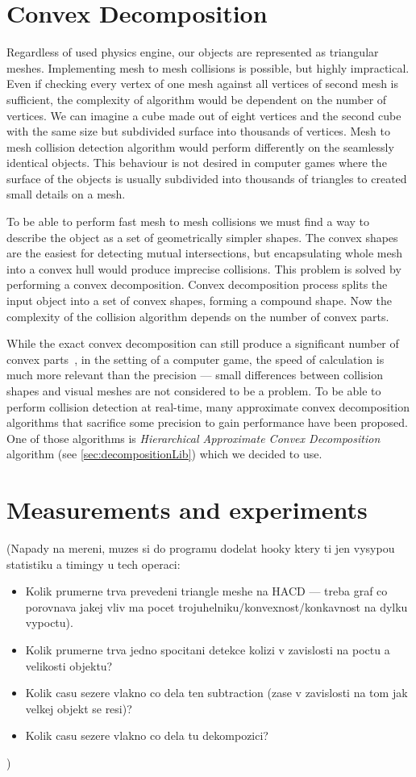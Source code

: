 \section{Convex Decomposition}
\label{sec:decomposition}
Regardless of used physics engine, our objects are represented as triangular meshes. Implementing mesh to mesh collisions is possible, but highly impractical. Even if checking every vertex of one mesh against all vertices of second mesh is sufficient, the complexity of algorithm would be dependent on the number of vertices. We can imagine a cube made out of eight vertices and the second cube with the same size but subdivided surface into thousands of vertices. Mesh to mesh collision detection algorithm would perform differently on the seamlessly identical objects. This behaviour is not desired in computer games where the surface of the objects is usually subdivided into thousands of triangles to created small details on a mesh.

To be able to perform fast mesh to mesh collisions we must find a way to describe the object as a set of geometrically simpler shapes. The convex shapes are the easiest for detecting mutual intersections, but encapsulating whole mesh into a convex hull would produce imprecise collisions. This problem is solved by performing a convex decomposition. Convex decomposition process splits the input object into a set of convex shapes, forming a compound shape. Now the complexity of the collision algorithm depends on the number of convex parts. 

While the exact convex decomposition can still produce a significant number of convex parts~\cite{convexDecomp}, in the setting of a computer game, the speed of calculation is much more relevant than the precision --- small differences between collision shapes and visual meshes are not considered to be a problem. To be able to perform collision detection at real-time, many approximate convex decomposition algorithms that sacrifice some precision to gain performance have been proposed. One of those algorithms is \emph{Hierarchical Approximate Convex Decomposition} algorithm (see \cref{sec:decompositionLib}) which we decided to use.

\section{Measurements and experiments}
\label{sec:testing}

(Napady na mereni, muzes si do programu dodelat hooky ktery ti jen vysypou statistiku a timingy u tech operaci:
\begin{itemize}
\item Kolik prumerne trva prevedeni triangle meshe na HACD --- treba graf co porovnava jakej vliv ma pocet trojuhelniku/konvexnost/konkavnost na dylku vypoctu).
\item Kolik prumerne trva jedno spocitani detekce kolizi v zavislosti na poctu a velikosti objektu?
\item Kolik casu sezere vlakno co dela ten subtraction (zase v zavislosti na tom jak velkej objekt se resi)?
\item Kolik casu sezere vlakno co dela tu dekompozici?
\end{itemize})
